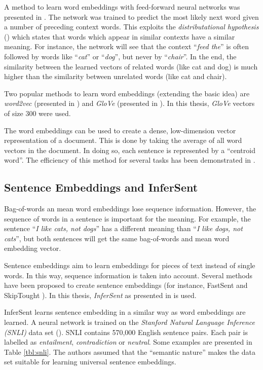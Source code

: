 A method to learn word embeddings with feed-forward neural networks was presented in \cite{bengio2003neural}. The network was trained to predict the most likely next word given a number of preceding context words. This exploits the \emph{distributational hypothesis} (\cite{harris1954distributional}) which states that words which appear in similar contexts have a similar meaning. For instance, the network will see that the context \enquote{\emph{feed the}} is often followed by words like \enquote{\emph{cat}} or \enquote{\emph{dog}}, but never by \enquote{\emph{chair}}. In the end, the similarity between the learned vectors of related words (like cat and dog) is much higher than the similarity between unrelated words (like cat and chair).

Two popular methods to learn word embeddings (extending the basic idea) are \emph{word2vec} (presented in \cite{NIPS2013_5021}) and \emph{GloVe} (presented in \cite{pennington2014glove}). In this thesis, \emph{GloVe} vectors of size 300 were used.

The word embeddings can be used to create a dense, low-dimension vector representation of a document. This is done by taking the average of all word vectors in the document. In doing so, each sentence is represented by a \enquote{centroid word}. The efficiency of this method for several tasks has been demonstrated in \cite{Wieting:2015aa}.

\subsection{Sentence Embeddings and InferSent}
Bag-of-words an mean word embeddings lose sequence information. However, the sequence of words in a sentence is important for the meaning. For example, the sentence \enquote{\emph{I like cats, not dogs}} has a different meaning than \enquote{\emph{I like dogs, not cats}}, but both sentences will get the same bag-of-words and mean word embedding vector.

Sentence embeddings aim to learn embeddings for pieces of text instead of single words. In this way, sequence information is taken into account. Several methods have been proposed to create sentence embeddings (for instance, FastSent \cite{hill2016learning} and SkipTought \cite{NIPS2015_5950}). In this thesis, \emph{InferSent} as presented in \cite{Conneau:2017aa} is used.


InferSent learns sentence embedding in a similar way as word embeddings are learned. A neural network is trained on the \emph{Stanford Natural Language Inference (SNLI)} data set (\cite{snli:emnlp2015}). SNLI contains 570,000 English sentence pairs. Each pair is labelled as \emph{entailment}, \emph{contradiction} or \emph{neutral}. Some examples are presented in Table \ref{tbl:snli}. The authors assumed that the \enquote{semantic nature} %
makes the data set suitable for learning universal sentence embeddings.

